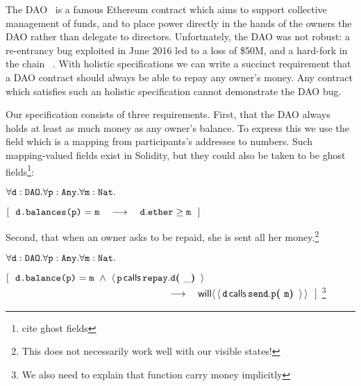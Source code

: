 The DAO~\cite{Dao}  is a famous Ethereum contract  which aims  to support
collective management of funds,  and to place power directly in the
hands of the owners the DAO
rather than delegate to directors.
Unfortnately, the DAO was not robust:
a re-entrancy bug   exploited in June 2016 led  to a loss of   \$50M, and
a hard-fork in the  chain ~\cite{DaoBug}.
%
With holistic specifications  we can  write a succinct requirement that a
DAO contract  should always be able to repay any owner's money.
Any contract which satisfies such an holistic specification cannot demonstrate the DAO bug.
 
Our specification consists of three requirements.
First, that the DAO always holds at least as 
much money as any owner's balance.  To express this we use 
the field  which is a mapping from participants's addresses to 
numbers. Such mapping-valued fields exist in Solidity, but they could
also be taken to be ghost fields\footnote{cite ghost fields}:

\vspace{.1cm}

\noindent
 \strut \hspace{0.5cm} $\forall \prg{d}:\prg{DAO}.\forall \prg{p}:\prg{Any}.\forall\prg{m}:\prg{Nat}.$\\
\strut \hspace{0.5cm} $[\ \ \prg{d.balances(p)}=\prg{m}  \ \ \  \longrightarrow  \ \ \ \prg{d}.\prg{ether}\geq \prg{m} \ \ ] $

\noindent
Second, that when an owner asks to be repaid, she is sent all her money.\footnote{This
does not necessarily work well with our visible states!}
\vspace{.1cm}

\noindent
 \strut \hspace{0.5cm} $\forall \prg{d}:\prg{DAO}.\forall \prg{p}:\prg{Any}.\forall\prg{m}:\prg{Nat}.$\\
\strut \hspace{0.5cm} $[\ \ \prg{d.balance(p)}=\prg{m}
 \ \wedge \ \Calls{\prg{p}}{\prg{d}}{\prg{repay}}{\_}  $\\
 $\strut \hspace{5.5cm}   \ \ \  \longrightarrow  \ \ \  \Future{\Calls{\prg{d}}{\prg{p}}{\prg{send}}{\prg{m}}}\ \ ] $ \footnote{We also need to explain that function carry money implicitly}

